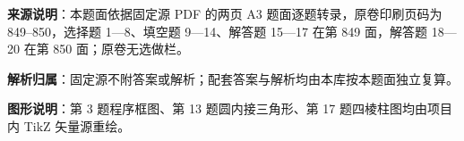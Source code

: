 

\begin{gknotice}
\textbf{来源说明}：本题面依据固定源 PDF 的两页 A3 题面逐题转录，原卷印刷页码为 849–850，选择题 1—8、填空题 9—14、解答题 15—17 在第 849 面，解答题 18—20 在第 850 面；原卷无选做栏。

\textbf{解析归属}：固定源不附答案或解析；配套答案与解析均由本库按本题面独立复算。

\textbf{图形说明}：第 3 题程序框图、第 13 题圆内接三角形、第 17 题四棱柱图均由项目内 TikZ 矢量源重绘。
\end{gknotice}


